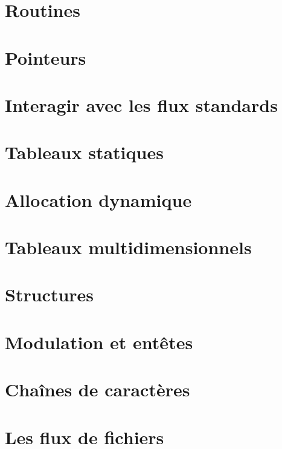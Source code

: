 \documentclass{minitelreport}
\begin{document}
\begin{refsection}
		\section{Routines}
			\label{sec:routines}
			
		\section{Pointeurs}
			\label{sec:pointeurs}
			
		\section{Interagir avec les flux standards}
			\label{sec:flux_standards}
			
		\section{Tableaux statiques}
			\label{sec:tableaux_statiques}
			
		\section{Allocation dynamique}
			\label{sec:allocation_dynamique}
			
		\section{Tableaux multidimensionnels}
			\label{sec:tableaux_multidimensionnels}
			
		\section{Structures}
			\label{sec:structures}
			
		\section{Modulation et entêtes}
			\label{sec:modulation_et_entetes}
			
		\section{Chaînes de caractères}
			\label{sec:chaines_caracteres}
			
		\section{Les flux de fichiers}
			\label{sec:flux_fichiers}
			

\end{refsection}
\end{document}
